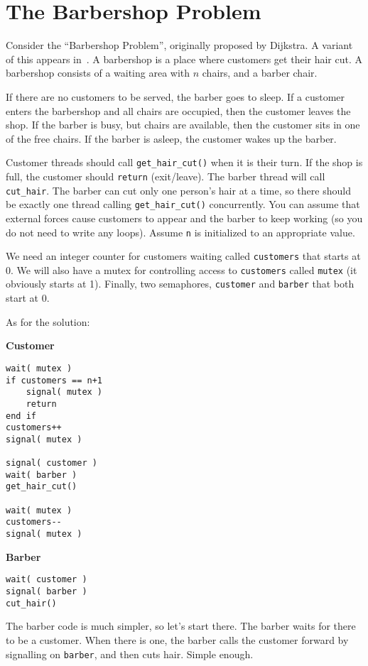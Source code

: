 \section*{The Barbershop Problem}
Consider the ``Barbershop Problem'', originally proposed by Dijkstra. A variant of this appears in~\cite{osc}. A barbershop is a place where customers get their hair cut. A barbershop consists of a waiting area with $n$ chairs, and a barber chair.

If there are no customers to be served, the barber goes to sleep. If a customer enters the barbershop and all chairs are occupied, then the customer leaves the shop. If the barber is busy, but chairs are available, then the customer sits in one of the free chairs. If the barber is asleep, the customer wakes up the barber.

Customer threads should call \texttt{get\_hair\_cut()} when it is their turn. If the shop is full, the customer should \texttt{return} (exit/leave). The barber thread will call \texttt{cut\_hair}. The barber can cut only one person's hair at a time, so there should be exactly one thread calling \texttt{get\_hair\_cut()} concurrently. You can assume that external forces cause customers to appear and the barber to keep working (so you do not need to write any loops). Assume \texttt{n} is initialized to an appropriate value.

We need an integer counter for customers waiting called \texttt{customers} that starts at 0. We will also have a mutex for controlling access to \texttt{customers} called \texttt{mutex} (it obviously starts at 1). Finally, two semaphores, \texttt{customer} and \texttt{barber} that both start at 0.

As for the solution:
\begin{multicols}{2}
	\textbf{Customer}
	\begin{lstlisting}
wait( mutex )
if customers == n+1
    signal( mutex )
    return
end if
customers++
signal( mutex )

signal( customer )
wait( barber )
get_hair_cut()

wait( mutex )
customers--
signal( mutex )
\end{lstlisting}
	\columnbreak
	\textbf{Barber}
	\begin{lstlisting}
wait( customer )
signal( barber )
cut_hair()
  \end{lstlisting}
\end{multicols}


The barber code is much simpler, so let's start there. The barber waits for there to be a customer. When there is one, the barber calls the customer forward by signalling on \texttt{barber}, and then cuts hair. Simple enough.

